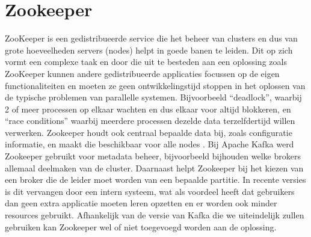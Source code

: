\section{Zookeeper}
ZooKeeper is een gedistribueerde service die het beheer van clusters en dus van grote hoeveelheden servers (nodes) helpt in goede banen te leiden. Dit op zich vormt een complexe taak en door die uit te besteden aan een oplossing zoals ZooKeeper kunnen andere gedistribueerde applicaties focussen op de eigen functionaliteiten en moeten ze geen ontwikkelingstijd stoppen in het oplossen van de typische problemen van parallelle systemen. Bijvoorbeeld ``deadlock'', waarbij 2 of meer processen op elkaar wachten en dus elkaar voor altijd blokkeren, en ``race conditions'' waarbij meerdere processen dezelde data terzelfdertijd willen verwerken. 
Zookeeper houdt ook centraal bepaalde data bij, zoals configuratie informatie, en maakt die beschikbaar voor alle nodes \autocite{ASF2023}.
\newline
\newline 
Bij Apache Kafka werd Zookeeper gebruikt voor metadata beheer, bijvoorbeeld bijhouden welke brokers allemaal deelmaken van de cluster. Daarnaast helpt Zookeeper bij het kiezen van een broker die de leider moet worden van een bepaalde partitie. In recente versies is dit vervangen door een intern systeem, wat als voordeel heeft dat gebruikers dan geen extra applicatie moeten leren opzetten en er worden ook minder resources gebruikt.
\autocite{Conduktor2023}
\newline
\newline
Afhankelijk van de versie van Kafka die we uiteindelijk zullen gebruiken kan Zookeeper wel of niet toegevoegd worden aan de oplossing.
\newline
\newline

